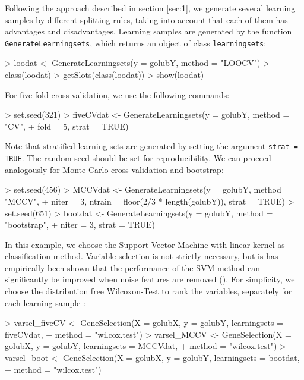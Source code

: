Following the approach described in \hyperref[sec:1]{section }{\ref{sec:1}}, we generate several learning samples
by different splitting rules, taking into account that each of them has advantages
and disadvantages.
Learning samples are generated by the function \texttt{GenerateLearningsets}, 
which returns an object of class \texttt{learningsets}:

\begin{Schunk}
\begin{Sinput}
> loodat <- GenerateLearningsets(y = golubY, method = "LOOCV")
> class(loodat)
> getSlots(class(loodat))
> show(loodat)
\end{Sinput}
\end{Schunk}

For five-fold cross-validation, we use the following commands:

\begin{Schunk}
\begin{Sinput}
> set.seed(321)
> fiveCVdat <- GenerateLearningsets(y = golubY, method = "CV", 
+     fold = 5, strat = TRUE)
\end{Sinput}
\end{Schunk}

Note that stratified learning sets are generated by setting the argument 
\texttt{strat = TRUE}. The random seed should be set for reproducibility. 
We can proceed analogously for Monte-Carlo cross-validation and bootstrap:

\begin{Schunk}
\begin{Sinput}
> set.seed(456)
> MCCVdat <- GenerateLearningsets(y = golubY, method = "MCCV", 
+     niter = 3, ntrain = floor(2/3 * length(golubY)), strat = TRUE)
> set.seed(651)
> bootdat <- GenerateLearningsets(y = golubY, method = "bootstrap", 
+     niter = 3, strat = TRUE)
\end{Sinput}
\end{Schunk}

In this example, we choose the Support Vector Machine with linear
kernel as classification method. Variable selection is not strictly necessary, 
but is has empirically been shown that the performance of the SVM method 
can significantly be improved when noise features are removed (\citet{Has2001}). 
For simplicity, we choose the distribution free
Wilcoxon-Test to rank the variables, separately for each learning sample :

\begin{Schunk}
\begin{Sinput}
> varsel_fiveCV <- GeneSelection(X = golubX, y = golubY, learningsets = fiveCVdat, 
+     method = "wilcox.test")
> varsel_MCCV <- GeneSelection(X = golubX, y = golubY, learningsets = MCCVdat, 
+     method = "wilcox.test")
> varsel_boot <- GeneSelection(X = golubX, y = golubY, learningsets = bootdat, 
+     method = "wilcox.test")
\end{Sinput}
\end{Schunk}

